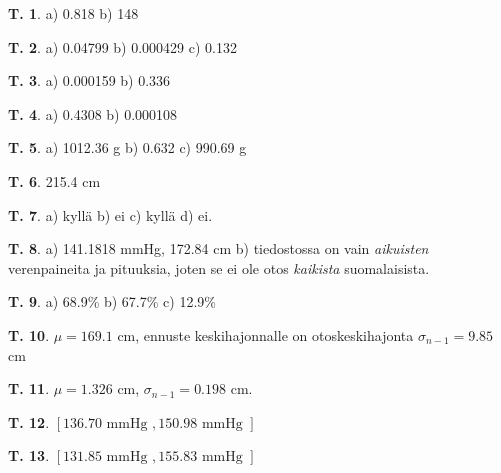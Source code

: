 \documentclass[12pt,leqno,a4paper,oneside]{amsart}
\theoremstyle{definition}
\newtheorem{exercise}{T.}
\theoremstyle{remark}
\numberwithin{equation}{section}
\begin{document}
\begin{exercise}
 a) 0.818 b) 148
\end{exercise}

\begin{exercise}
 a) 0.04799 b) 0.000429 c) 0.132
\end{exercise}

\begin{exercise}
 a) 0.000159 b) 0.336
\end{exercise}

\begin{exercise}
 a) 0.4308 b) 0.000108
\end{exercise}


\begin{exercise}
  a) 1012.36 g
  b) 0.632
  c) 990.69 g
\end{exercise}

\begin{exercise}
  215.4 cm
\end{exercise}




\begin{exercise}
 a) kyllä
 b) ei
 c) kyllä
 d) ei.
\end{exercise}



\begin{exercise}
 a) 141.1818 mmHg, 172.84 cm
 b) tiedostossa on vain \emph{aikuisten} verenpaineita ja pituuksia, joten se ei ole otos \emph{kaikista} suomalaisista.
\end{exercise}

\begin{exercise} 
 a) 68.9\%
 b) 67.7\%
 c) 12.9\%
\end{exercise}

\begin{exercise}
$\mu= 169.1$ cm, ennuste keskihajonnalle on otoskeskihajonta $\sigma_{n-1} = 9.85$ cm
\end{exercise}

\begin{exercise}
$\mu=1.326$ cm, $\sigma_{n-1} = 0.198$ cm.
\end{exercise}



\begin{exercise}
 $[136.70\text{ mmHg }, 150.98\text{ mmHg }]$  
\end{exercise}


\begin{exercise}
$[131.85\text{ mmHg }, 155.83\text{ mmHg }]$ 
\end{exercise}
\end{document}
